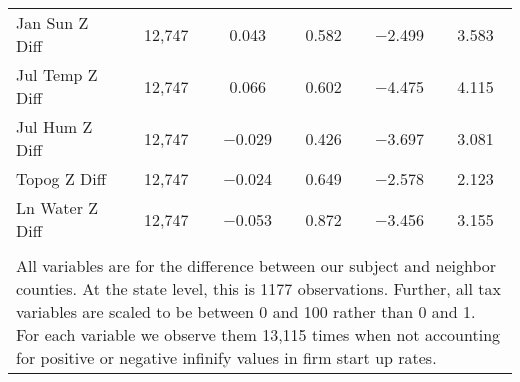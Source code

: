 \begin{table}[!htbp]
\begin{tabular}{@{\extracolsep{5pt}}lccccc}
Jan Sun Z Diff & 12,747 & 0.043 & 0.582 & $-$2.499 & 3.583 \\ 
Jul Temp Z Diff & 12,747 & 0.066 & 0.602 & $-$4.475 & 4.115 \\ 
Jul Hum Z Diff & 12,747 & $-$0.029 & 0.426 & $-$3.697 & 3.081 \\ 
Topog Z Diff & 12,747 & $-$0.024 & 0.649 & $-$2.578 & 2.123 \\ 
Ln Water Z Diff & 12,747 & $-$0.053 & 0.872 & $-$3.456 & 3.155 \\ 
\hline \\[-1.8ex] 
\multicolumn{6}{l}{All variables are for the difference between our subject and neighbor counties. At the state level, this is 1177 observations. Further, all tax variables are scaled to be between 0 and 100 rather than 0 and 1. For each variable we observe them 13,115 times when not accounting for positive or negative infinify values in firm start up rates.} \\ 
\end{tabular} 
\end{table} 
